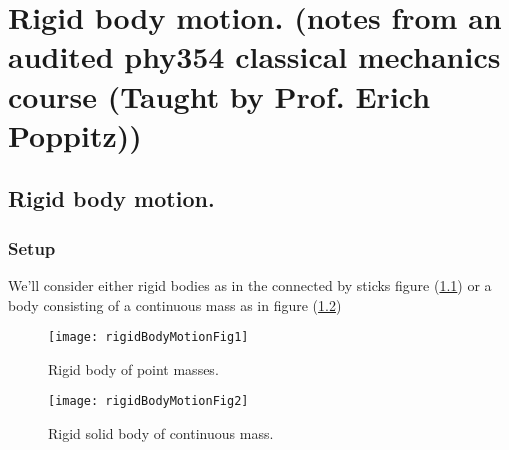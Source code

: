 
%


\chapter{Rigid body motion.  (notes from an audited phy354 classical mechanics course (Taught by Prof. Erich Poppitz))}
\label{chap:rigidBodyMotion}
{}
\date{Mar 7, 2012}

\beginArtWithToc

\section{Rigid body motion.}

\subsection{Setup}

We'll consider either rigid bodies as in the connected by sticks figure (\ref{fig:rigidBodyMotion:rigidBodyMotionFig1}) or a body consisting of a continuous mass as in figure (\ref{fig:rigidBodyMotion:rigidBodyMotionFig2})

\begin{figure}[htp]
   \centering
   \texttt{[image: rigidBodyMotionFig1]}
   \caption{Rigid body of point masses.}\label{fig:rigidBodyMotion:rigidBodyMotionFig1}
\end{figure}

\begin{figure}[htp]
   \centering
   \texttt{[image: rigidBodyMotionFig2]}
   \caption{Rigid solid body of continuous mass.}\label{fig:rigidBodyMotion:rigidBodyMotionFig2}
\end{figure}

